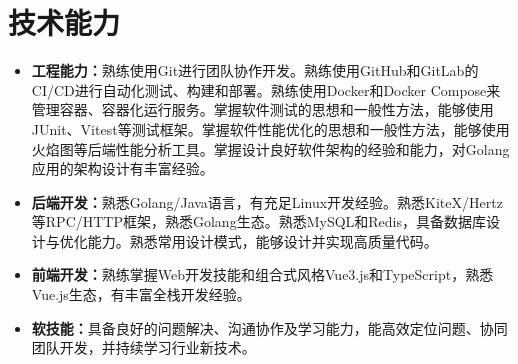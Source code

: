 \documentclass{style/template}
\begin{document}
\section{技术能力}

\begin{itemize}
    \item \textbf{工程能力：}熟练使用Git进行团队协作开发。熟练使用GitHub和GitLab的CI/CD进行自动化测试、构建和部署。熟练使用Docker和Docker Compose来管理容器、容器化运行服务。掌握软件测试的思想和一般性方法，能够使用JUnit、Vitest等测试框架。掌握软件性能优化的思想和一般性方法，能够使用火焰图等后端性能分析工具。掌握设计良好软件架构的经验和能力，对Golang应用的架构设计有丰富经验。
    \item \textbf{后端开发：}熟悉Golang/Java语言，有充足Linux开发经验。熟悉KiteX/Hertz等RPC/HTTP框架，熟悉Golang生态。熟悉MySQL和Redis，具备数据库设计与优化能力。熟悉常用设计模式，能够设计并实现高质量代码。
    \item \textbf{前端开发：}熟练掌握Web开发技能和组合式风格Vue3.js和TypeScript，熟悉Vue.js生态，有丰富全栈开发经验。
    \item \textbf{软技能：}具备良好的问题解决、沟通协作及学习能力，能高效定位问题、协同团队开发，并持续学习行业新技术。
\end{itemize}
\end{document}
